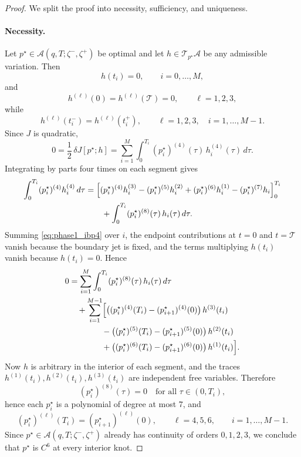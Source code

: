 \begin{proof}
  We split the proof into necessity, sufficiency, and uniqueness.

  \paragraph{Necessity.}
  Let $p^\star\in\mathcal A(q,T;\zeta^-,\zeta^+)$ be optimal and let
  $h\in \mathcal T_{p^\star}\mathcal A$ be any admissible variation. Then
  \[
    h(t_i)=0,\qquad i=0,\dots,M,
  \]
  and
  \[
    h^{(\ell)}(0)=h^{(\ell)}(\mathcal T)=0,\qquad \ell=1,2,3,
  \]
  while
  \[
    h^{(\ell)}(t_i^-)=h^{(\ell)}(t_i^+),\qquad \ell=1,2,3,\quad i=1,\dots,M-1.
  \]
  Since $J$ is quadratic,
  \[
    0
    =
    \frac{1}{2}\,\delta J[p^\star;h]
    =
    \sum_{i=1}^{M}\int_{0}^{T_i} (p_i^\star)^{(4)}(\tau)\, h_i^{(4)}(\tau)\,d\tau.
  \]
  Integrating by parts four times on each segment gives
  \begin{align}
    \int_{0}^{T_i} (p_i^\star)^{(4)} h_i^{(4)}\,d\tau
    &=
    \Bigl[
      (p_i^\star)^{(4)} h_i^{(3)}
      -
      (p_i^\star)^{(5)} h_i^{(2)}
      +
      (p_i^\star)^{(6)} h_i^{(1)}
      -
      (p_i^\star)^{(7)} h_i
    \Bigr]_{0}^{T_i}
    \notag\\
    &\qquad
    +
    \int_{0}^{T_i}(p_i^\star)^{(8)}(\tau)\,h_i(\tau)\,d\tau .
    \label{eq:phase1_ibp4}
  \end{align}
  Summing \eqref{eq:phase1_ibp4} over $i$, the endpoint contributions at $t=0$ and $t=\mathcal T$
  vanish because the boundary jet is fixed, and the terms multiplying $h(t_i)$ vanish because
  $h(t_i)=0$. Hence
  \begin{align}
    0
    &=
    \sum_{i=1}^{M}\int_{0}^{T_i}(p_i^\star)^{(8)}(\tau)\,h_i(\tau)\,d\tau
    \notag\\
    &\quad
    +
    \sum_{i=1}^{M-1}
    \Bigl[
      \bigl((p_i^\star)^{(4)}(T_i)-(p_{i+1}^\star)^{(4)}(0)\bigr)\,h^{(3)}(t_i)
      \notag\\
      &\qquad\qquad
      -
      \bigl((p_i^\star)^{(5)}(T_i)-(p_{i+1}^\star)^{(5)}(0)\bigr)\,h^{(2)}(t_i)
      \notag\\
      &\qquad\qquad
      +
      \bigl((p_i^\star)^{(6)}(T_i)-(p_{i+1}^\star)^{(6)}(0)\bigr)\,h^{(1)}(t_i)
    \Bigr].
    \label{eq:phase1_variation_reduced}
  \end{align}
  Now $h$ is arbitrary in the interior of each segment, and the traces
  $h^{(1)}(t_i),h^{(2)}(t_i),h^{(3)}(t_i)$ are independent free variables. Therefore
  \[
    (p_i^\star)^{(8)}(\tau)=0
    \quad\text{for all }\tau\in(0,T_i),
  \]
  hence each $p_i^\star$ is a polynomial of degree at most $7$, and
  \[
    (p_i^\star)^{(\ell)}(T_i)=(p_{i+1}^\star)^{(\ell)}(0),
    \qquad \ell=4,5,6,
    \qquad i=1,\dots,M-1.
  \]
  Since $p^\star\in\mathcal A(q,T;\zeta^-,\zeta^+)$ already has continuity of orders $0,1,2,3$,
  we conclude that $p^\star$ is $C^6$ at every interior knot.


\end{proof}
